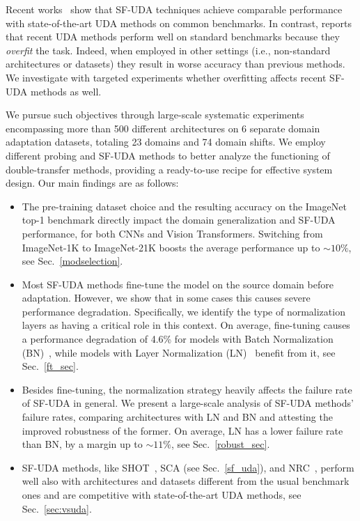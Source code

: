 \documentclass{article}
\begin{document}
Recent works~\citep{liang2020we, ding2022source} show that SF-UDA techniques achieve comparable performance with state-of-the-art UDA methods on common benchmarks. 
In contrast, \cite{kim2022broad} reports that recent UDA methods perform well on standard benchmarks because they \textit{overfit} the task. 
Indeed, when employed in other settings (i.e., non-standard architectures or datasets) they result in worse accuracy than previous methods. 
We investigate with targeted experiments whether overfitting affects recent SF-UDA methods as well.

We pursue such objectives through large-scale systematic experiments encompassing more than 500 different architectures on 6 separate domain adaptation datasets, totaling 23 domains and 74 domain shifts. 
We employ different probing and SF-UDA methods to better analyze the functioning of double-transfer methods, providing a ready-to-use recipe for effective system design. Our main findings are as follows:

\begin{itemize}
    \item The pre-training dataset choice and the resulting accuracy on the ImageNet top-1 benchmark directly impact the domain generalization and SF-UDA performance, for both CNNs and Vision Transformers. Switching from ImageNet-1K to ImageNet-21K boosts the average performance up to $\sim10\%$, see Sec.~\ref{modselection}.

     \item Most SF-UDA methods fine-tune the model on the source domain before adaptation. 
     However, we show that in some cases this causes severe performance degradation. Specifically, we identify the type of normalization layers as having a critical role in this context. On average, fine-tuning causes a performance degradation of 4.6\% for models with Batch Normalization (BN)~\citep{ioffe2015batch}, while models with Layer Normalization (LN)~\citep{ba2016layer} benefit from it, see Sec.~\ref{ft_sec}.

     \item Besides fine-tuning, the normalization strategy heavily affects  the failure rate of SF-UDA in general. 
     We present a large-scale analysis of SF-UDA methods' failure rates, comparing architectures with LN and BN and attesting the improved robustness of the former. On average, LN has a lower failure rate than BN, by a margin up to $\sim11\%$, see Sec.~\ref{robust_sec}.
   
    \item SF-UDA methods, like SHOT~\citep{liang2020we}, SCA (see Sec.~\ref{sf_uda}), and NRC~\citep{yang2021exploiting}, perform well also with architectures and datasets different from the usual benchmark ones and are competitive with state-of-the-art UDA methods, see Sec.~\ref{sec:vsuda}. 
\end{itemize}
\end{document}
